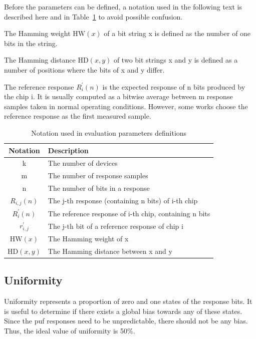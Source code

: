 Before the parameters can be defined, a notation used in the following text is described here and in Table~\ref{table:notation} to avoid possible confusion.

The Hamming weight $\textrm{HW}(x)$ of a bit string x is defined as the number of one bits in the string. 

The Hamming distance $\textrm{HD}(x, y)$ of two bit strings x and y is defined as a number of positions where the bits of x and y differ.

The reference response $R_{i}^{'}(n)$ is the expected response of n bits produced by the chip i. It is usually computed as a bitwise average between m response samples taken in normal operating conditions. However, some works choose the reference response as the first measured sample.\cite{Kodytek2020}

\begin{table}[h!]
\centering
\begin{tabular}{c l} 
     Notation & Description\\
     \hline
     k & The number of devices\\ 
     m & The number of response samples\\
     n & The number of bits in a response\\ 
     $R_{i,j}(n)$ & The j-th response (containing n bits) of i-th chip\\ 
     $R_{i}^{'}(n)$ & The reference response of i-th chip, containing n bits\\ 
     $r_{i,j}^{'}$ & The j-th bit of a reference response of chip i\\
     $\textrm{HW}(x)$ & The Hamming weight of x\\
     $\textrm{HD}(x, y)$ & The Hamming distance between x and y\\
     \hline
    \end{tabular}
    \captionsetup{justification=centering,margin=0.5cm}
    \caption{Notation used in evaluation parameters definitions}
    \label{table:notation}
\end{table}

\subsection{Uniformity}\label{sec:uniformity}

Uniformity represents a proportion of zero and one states of the response bits. It is useful to determine if there exists a global bias towards any of these states. Since the \gls{puf} responses need to be unpredictable, there should not be any bias. Thus, the ideal value of uniformity is 50\%.

